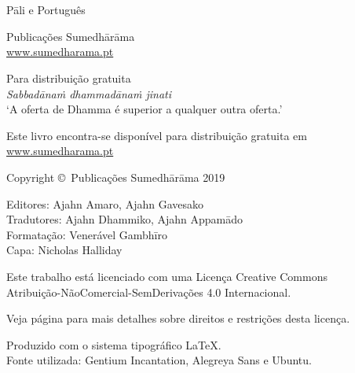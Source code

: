 
\thispagestyle{empty}

\enlargethispage{\baselineskip}

{\centering\small
\setlength{\parskip}{15pt}

{\normalsize
\thetitle\\
\thesubtitle\\
Pāli e Português}

Publicações Sumedhārāma\\
\href{http://sumedharama.pt}{www.sumedharama.pt}

Para distribuição gratuita\\
\textit{Sabbadānaṁ dhammadānaṁ jinati}\\
‘A oferta de Dhamma é superior a qualquer outra oferta.’

Este livro encontra-se disponível para distribuição gratuita em\\
\href{http://sumedharama.pt}{www.sumedharama.pt}


Copyright \copyright\ Publicações Sumedhārāma 2019

Editores: Ajahn Amaro, Ajahn Gavesako\\
Tradutores: Ajahn Dhammiko, Ajahn Appamādo\\
Formatação: Venerável Gambhīro\\
Capa: Nicholas Halliday

\vfill

Este trabalho está licenciado com uma Licença Creative Commons\\
Atribuição-NãoComercial-SemDerivações 4.0 Internacional.

Veja página \pageref{copyright-details} para mais detalhes sobre direitos e restrições desta licença.

Produzido com o sistema tipográfico \LaTeX.\\
Fonte utilizada: Gentium Incantation, Alegreya Sans e Ubuntu.

\theEditionInfo

}
